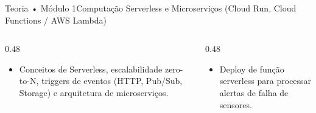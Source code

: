 \begin{senaiframe}{Teoria • Módulo 1}{Computação Serverless e Microserviços (Cloud Run, Cloud Functions / AWS Lambda)}
  \begin{columns}[t]
    \begin{column}{0.48\textwidth}
      \begin{tcolorbox}[senaibluecard, title={Fundamentos Teóricos}]
        \begin{itemize}
          \item Conceitos de Serverless, escalabilidade zero-to-N, triggers de eventos (HTTP, Pub/Sub, Storage) e arquitetura de microserviços.
        \end{itemize}
      \end{tcolorbox}
    \end{column}
    \begin{column}{0.48\textwidth}
      \begin{tcolorbox}[senaigreencard, title={Prática \& Laboratório}]
        \begin{itemize}
          \item Deploy de função serverless para processar alertas de falha de sensores.
        \end{itemize}
      \end{tcolorbox}
    \end{column}
  \end{columns}
\end{senaiframe}
